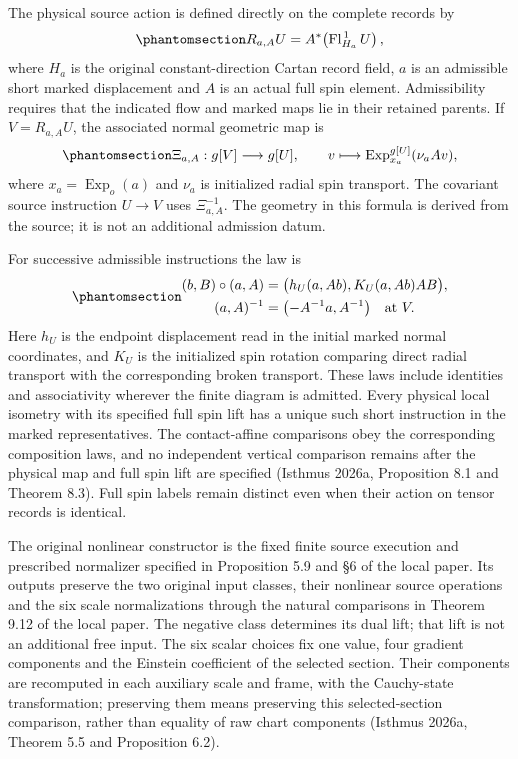 \documentclass[
  english,
  11pt,
  reqno]{amsart}
\begin{document}
The physical source action is defined directly on the complete records
by
\begin{equation}\protect\phantomsection\label{eq:original-source-physical-record-action}{
R_{a,A}U
=A^*\!\left(\operatorname{Fl}_{H_a}^{\,1}U\right),
}\end{equation} where \(H_a\) is the original constant-direction Cartan
record field, \(a\) is an admissible short marked displacement and \(A\)
is an actual full spin element. Admissibility requires that the
indicated flow and marked maps lie in their retained parents. If
\(V=R_{a,A}U\), the associated normal geometric map is
\begin{equation}\protect\phantomsection\label{eq:original-source-physical-map-direction}{
\Xi_{a,A}:g[V]\longrightarrow g[U],
\qquad
v\longmapsto\operatorname{Exp}_{x_a}^{g[U]}(\nu_aAv),
}\end{equation} where \(x_a=\operatorname{Exp}_o(a)\) and \(\nu_a\) is
initialized radial spin transport. The covariant source instruction
\(U\to V\) uses \(\Xi_{a,A}^{-1}\). The geometry in this formula is
derived from the source; it is not an additional admission datum.

For successive admissible instructions the law is
\begin{equation}\protect\phantomsection\label{eq:original-source-physical-composition}{
\begin{aligned}
(b,B)\circ(a,A)
&=\bigl(h_U(a,Ab),K_U(a,Ab)AB\bigr),\\
(a,A)^{-1}
&=\bigl(-A^{-1}a,A^{-1}\bigr)
\quad\text{at }V.
\end{aligned}
}\end{equation} Here \(h_U\) is the endpoint displacement read in the
initial marked normal coordinates, and \(K_U\) is the initialized spin
rotation comparing direct radial transport with the corresponding broken
transport. These laws include identities and associativity wherever the
finite diagram is admitted. Every physical local isometry with its
specified full spin lift has a unique such short instruction in the
marked representatives. The contact-affine comparisons obey the
corresponding composition laws, and no independent vertical comparison
remains after the physical map and full spin lift are specified (Isthmus
2026a, Proposition 8.1 and Theorem 8.3). Full spin labels remain
distinct even when their action on tensor records is identical.

The original nonlinear constructor is the fixed finite source execution
and prescribed normalizer specified in Proposition 5.9 and §6 of the
local paper. Its outputs preserve the two original input classes, their
nonlinear source operations and the six scale normalizations through the
natural comparisons in Theorem 9.12 of the local paper. The negative
class determines its dual lift; that lift is not an additional free
input. The six scalar choices fix one value, four gradient components
and the Einstein coefficient of the selected section. Their components
are recomputed in each auxiliary scale and frame, with the Cauchy-state
transformation; preserving them means preserving this selected-section
comparison, rather than equality of raw chart components (Isthmus 2026a,
Theorem 5.5 and Proposition 6.2).
\end{document}
